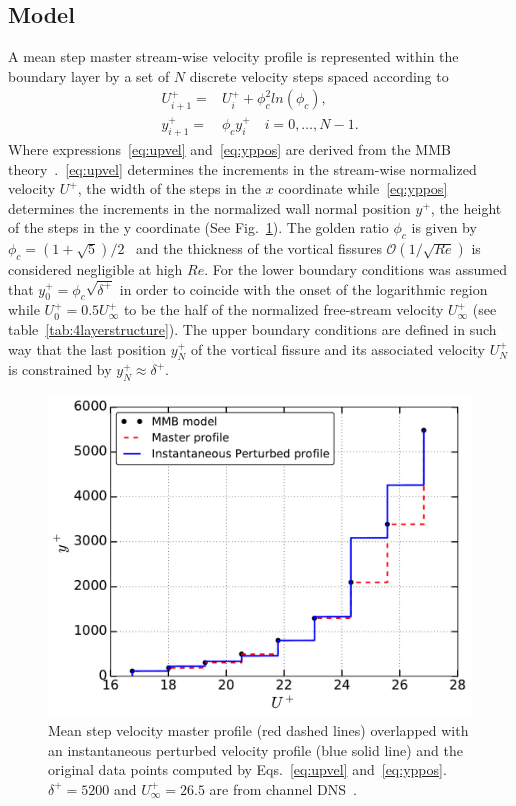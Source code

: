 \documentclass[aps,reprint,amsmath,amssymb,pra]{revtex4-1}%
\begin{document}
\subsection{Model\label{subsec:toymodel}}
A  mean step master stream-wise velocity profile is represented within the boundary layer by a set of $N$ discrete velocity steps spaced according to  
\begin{align}
U^+_{i+1}=&U^+_i+\phi_c^2 ln(\phi_c) \label{eq:upvel},\\
y^+_{i+1}=&\phi_c y^+_i\quad i=0,\ldots ,N-1. \label{eq:yppos}
\end{align}
Where expressions~\eqref{eq:upvel} and~\eqref{eq:yppos} are derived from the MMB theory~\citep{Klewickimmb}.~\eqref{eq:upvel} determines the increments in the stream-wise normalized velocity $U^+$, the width of the steps in the $x$ coordinate while~\eqref{eq:yppos} determines the increments in the normalized wall normal position $y^+$, the height of the steps in the y coordinate (See Fig.~\ref{fig:master_profile}). The golden ratio $\phi_c$ is given by $\phi_c=(1+\sqrt{5})/2$~\cite{klewicki2014} and the thickness of the vortical fissures $\mathcal{O}(1/\sqrt{Re})$ is considered negligible at high $Re$. For the lower boundary conditions was assumed that $y^+_0=\phi_c\sqrt{\delta^+}$ in order to coincide with the onset of the logarithmic region  while $U^+_0=0.5 U_{\infty}^+$ to be the half of the normalized free-stream velocity $U_{\infty}^+$ (see table~\ref{tab:4layerstructure}).
The upper boundary conditions are defined in such way that the last position $y_{N}^+$ of the vortical fissure and its associated velocity $U^+_{N}$ is constrained by $y_{N}^+\approx\delta^+$.\\

\begin{figure}[tb]
\includegraphics[scale=0.45]{figures/Master_step_profile}
\caption{\label{fig:master_profile} Mean step velocity master profile (red dashed lines) overlapped with an instantaneous perturbed velocity profile (blue solid line) and the original data points computed by Eqs.~\eqref{eq:upvel} and~\eqref{eq:yppos}. $\delta^+=5200$ and $U^+_{\infty}=26.5$ are from channel DNS~\citep{leemoser2015}.}
\end{figure} 
\end{document}
